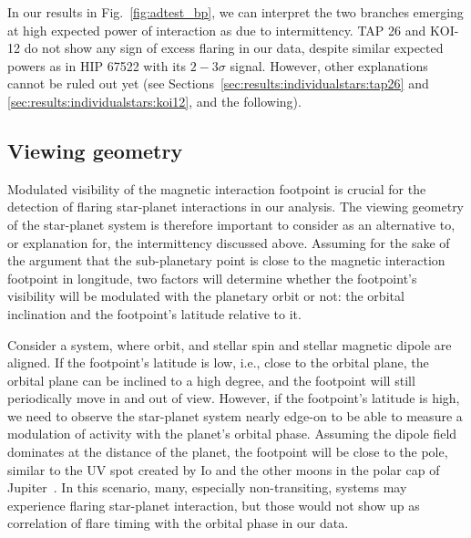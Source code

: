 \documentclass[twocolumn]{aastex631}
\begin{document}
In our results in Fig.~\ref{fig:adtest_bp}, we can interpret the two branches emerging at high expected power of interaction as due to intermittency. TAP 26 and KOI-12 do not show any sign of excess flaring in our data, despite similar expected powers as in HIP 67522 with its $2-3\sigma$ signal. However, other explanations cannot be ruled out yet (see Sections~\ref{sec:results:individualstars:tap26} and \ref{sec:results:individualstars:koi12}, and the following).


\subsection{Viewing geometry}
\label{sec:discussion:viewing}
Modulated visibility of the magnetic interaction footpoint is crucial for the detection of flaring star-planet interactions in our analysis. The viewing geometry of the star-planet system is therefore important to consider as an alternative to, or explanation for, the intermittency discussed above. Assuming for the sake of the argument that the sub-planetary point is close to the magnetic interaction footpoint in longitude, two factors will determine whether the footpoint's visibility will be modulated with the planetary orbit or not: the orbital inclination and the footpoint's latitude relative to it. 

Consider a system, where orbit, and stellar spin and stellar magnetic dipole are aligned. If the footpoint's latitude is low, i.e., close to the orbital plane, the orbital plane can be inclined to a high degree, and the footpoint will still periodically move in and out of view. However, if the footpoint's latitude is high, we need to observe the star-planet system nearly edge-on to be able to measure a modulation of activity with the planet's orbital phase. Assuming the dipole field dominates at the distance of the planet, the footpoint will be close to the pole, similar to the UV spot created by Io and the other moons in the polar cap of Jupiter~\citep{clarke1996farultraviolet, prange1996rapid}. In this scenario, many, especially non-transiting, systems may experience flaring star-planet interaction, but those would not show up as correlation of flare timing with the orbital phase in our data.
\end{document}
